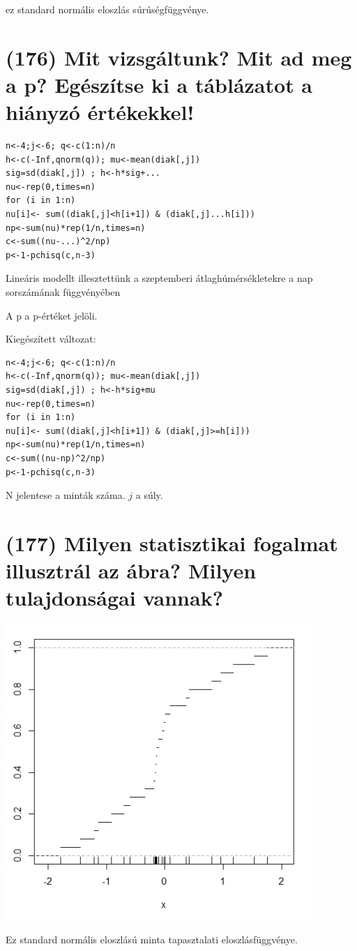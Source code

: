 \documentclass[12p]{article}
\begin{document}
ez standard normális eloszlás súrúségfüggvénye.


\section{(176) Mit vizsgáltunk? Mit ad meg a p? Egészítse ki a táblázatot a hiányzó értékekkel!}

\begin{verbatim}
n<-4;j<-6; q<-c(1:n)/n
h<-c(-Inf,qnorm(q)); mu<-mean(diak[,j])
sig=sd(diak[,j]) ; h<-h*sig+...
nu<-rep(0,times=n)
for (i in 1:n)
nu[i]<- sum((diak[,j]<h[i+1]) & (diak[,j]...h[i]))
np<-sum(nu)*rep(1/n,times=n)
c<-sum((nu-...)^2/np)
p<-1-pchisq(c,n-3)
\end{verbatim}

Lineáris modellt illesztettünk a
szeptemberi átlaghúmérsékletekre a nap sorszámának függvényében

A p a p-értéket jelöli.

Kiegészített változat:

\begin{verbatim}
n<-4;j<-6; q<-c(1:n)/n
h<-c(-Inf,qnorm(q)); mu<-mean(diak[,j])
sig=sd(diak[,j]) ; h<-h*sig+mu
nu<-rep(0,times=n)
for (i in 1:n)
nu[i]<- sum((diak[,j]<h[i+1]) & (diak[,j]>=h[i]))
np<-sum(nu)*rep(1/n,times=n)
c<-sum((nu-np)^2/np)
p<-1-pchisq(c,n-3)
\end{verbatim}

N jelentese a minták száma. $j$ a súly.


\section{(177) Milyen statisztikai fogalmat illusztrál az ábra? Milyen tulajdonságai vannak?}

\includegraphics[scale=1.0]{gorbe2}

Ez standard normális eloszlású minta tapasztalati eloszlásfüggvénye.
\end{document}
